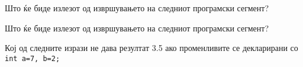 \documentclass[11pt]{examdesign}
\begin{document}
\begin{multiplechoice}[title={},suppressprefix=yes,rearrange=no]
\begin{question}
Што ќе биде излезот од извршувањето на следниот програмски сегмент?
\end{question}

\begin{question}
Што ќе биде излезот од извршувањето на следниот програмски сегмент?
  \end{question}

\begin{question}
Кој од следните изрази не дава резултат 3.5 ако променливите се декларирани со \texttt{int a=7, b=2;}
\end{question}

\end{multiplechoice}
\end{document}

